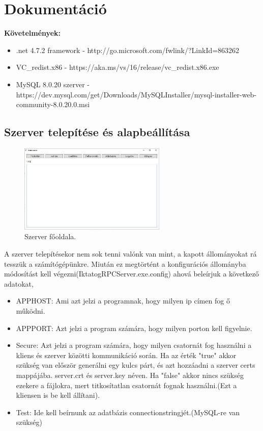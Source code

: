 \documentclass[
]{thesis-ekf}
\theoremstyle{definition}
\theoremstyle{remark}
\begin{document}
\chapter{Dokumentáció}
\textbf{Követelmények:}
\begin{itemize}
	\item .net 4.7.2 framework - http://go.microsoft.com/fwlink/?LinkId=863262
	\item VC\_redist.x86 - https://aka.ms/vs/16/release/vc\_redist.x86.exe
	\item MySQL 8.0.20 szerver - https://dev.mysql.com/get/Downloads/MySQLInstaller/mysql-installer-web-community-8.0.20.0.msi
\end{itemize}
\section{Szerver telepítése és alapbeállítása}
\begin{figure}[!th]
	\centering
	\includegraphics[width=7cm]{dokukepek/sfooldal}
	\caption{Szerver főoldala.}
	\label{fig:sfooldal}
\end{figure}

A szerver telepítésekor nem sok tenni valónk van mint, a kapott állományokat rá tesszük a számítógépünkre. Miután ez megtörtént a konfigurációs állományba módosítást kell végezni(IktatogRPCServer.exe.config) ahová beleírjuk a következő adatokat, 
\begin{itemize}
	\item[] APPHOST: Ami azt jelzi a programnak, hogy milyen ip címen fog ő működni.
	\item[] APPPORT: Azt jelzi a program számára, hogy milyen porton kell figyelnie.
	\item[] Secure: Azt jelzi a program számára, hogy milyen csatornát fog használni a kliens és szerver közötti kommunikáció során. Ha az érték "true" akkor szükség van először generálni egy kulcs párt, és azt hozzáadni a szerver certs mappájába. server.crt és server.key néven. Ha "false" akkor nincs szükség ezekere a fájlokra, mert titkosítatlan csatornát fognak használni.(Ezt a kliensen is be kell állítani).
	\item[] Test: Ide kell beírnunk az adatbázis connectionstringjét.(MySQL-re van szükség)
\end{itemize}
\end{document}
